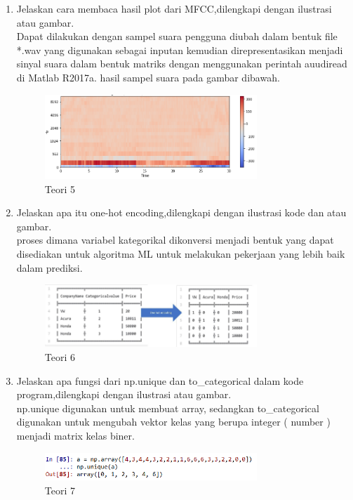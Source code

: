 \begin{enumerate}
\item Jelaskan cara membaca hasil plot dari MFCC,dilengkapi dengan ilustrasi atau gambar.
	\hfill\\
Dapat dilakukan dengan sampel  suara  pengguna diubah dalam  bentuk  file  *.wav  yang  digunakan  sebagai  inputan kemudian direpresentasikan menjadi sinyal suara dalam bentuk matriks dengan menggunakan perintah auudiread di Matlab R2017a. hasil sampel suara pada gambar dibawah.
\begin{figure}[H]
    \includegraphics[width=8cm]{figures/1174084/6/teori5.png}
    \centering
    \caption{Teori 5}
\end{figure}

\item Jelaskan apa itu one-hot encoding,dilengkapi dengan ilustrasi kode dan atau gambar.
	\hfill\\
	proses dimana variabel kategorikal dikonversi menjadi bentuk yang dapat disediakan untuk algoritma ML untuk melakukan pekerjaan yang lebih baik dalam prediksi.
\begin{figure}[H]
    \includegraphics[width=8cm]{figures/1174084/6/teori6.png}
    \centering
    \caption{Teori 6}
\end{figure}

\item Jelaskan apa fungsi dari np.unique dan to\_categorical dalam kode program,dilengkapi dengan ilustrasi atau gambar.
	\hfill\\
	np.unique digunakan untuk membuat array, sedangkan  to\_categorical digunakan untuk mengubah vektor kelas yang berupa integer ( number ) menjadi matrix kelas biner.
\begin{figure}[H]
    \includegraphics[width=8cm]{figures/1174084/6/teori7_1.png}
    \centering
    \caption{Teori 7}
\end{figure}


\end{enumerate}
